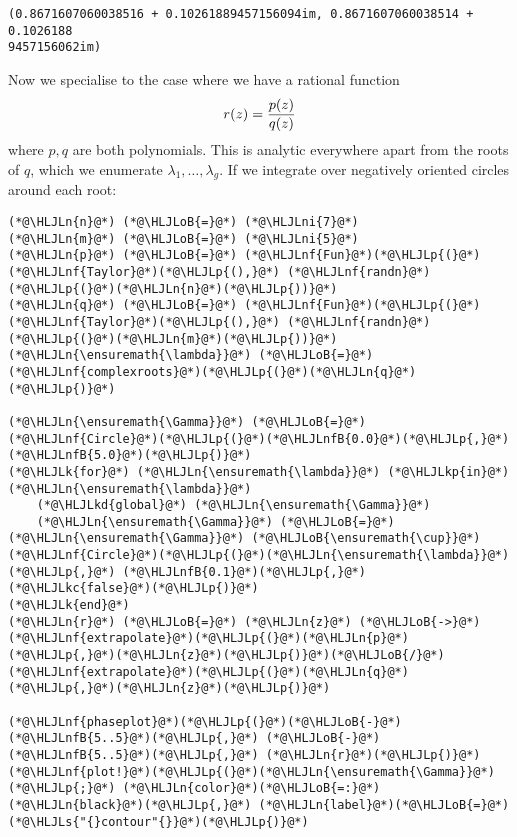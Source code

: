 \documentclass[12pt,landscape]{article}
\newcommand{\HLJLk}[1]{\textcolor[RGB]{148,91,176}{\textbf{#1}}}
\newcommand{\HLJLkc}[1]{\textcolor[RGB]{59,151,46}{\textit{#1}}}
\newcommand{\HLJLkd}[1]{\textcolor[RGB]{214,102,97}{\textit{#1}}}
\newcommand{\HLJLkp}[1]{\textcolor[RGB]{148,91,176}{\textbf{#1}}}
\newcommand{\HLJLn}[1]{#1}
\newcommand{\HLJLnf}[1]{\textcolor[RGB]{66,102,213}{#1}}
\newcommand{\HLJLs}[1]{\textcolor[RGB]{201,61,57}{#1}}
\newcommand{\HLJLnfB}[1]{\textcolor[RGB]{59,151,46}{#1}}
\newcommand{\HLJLni}[1]{\textcolor[RGB]{59,151,46}{#1}}
\newcommand{\HLJLoB}[1]{\textcolor[RGB]{102,102,102}{\textbf{#1}}}
\newcommand{\HLJLp}[1]{#1}
\begin{document}
{\begin{lstlisting}
(0.8671607060038516 + 0.10261889457156094im, 0.8671607060038514 + 0.1026188
9457156062im)
\end{lstlisting}


Now we specialise to the case where we have a rational function
\[
r(z) = {p(z) \over q(z)}
\]
where $p,q$ are both polynomials. This is analytic everywhere apart from the roots of $q$, which we enumerate $\lambda_1,\ldots,\lambda_g$.   If we integrate over negatively oriented circles around each root:


\begin{lstlisting}
(*@\HLJLn{n}@*) (*@\HLJLoB{=}@*) (*@\HLJLni{7}@*)
(*@\HLJLn{m}@*) (*@\HLJLoB{=}@*) (*@\HLJLni{5}@*)
(*@\HLJLn{p}@*) (*@\HLJLoB{=}@*) (*@\HLJLnf{Fun}@*)(*@\HLJLp{(}@*)(*@\HLJLnf{Taylor}@*)(*@\HLJLp{(),}@*) (*@\HLJLnf{randn}@*)(*@\HLJLp{(}@*)(*@\HLJLn{n}@*)(*@\HLJLp{))}@*)
(*@\HLJLn{q}@*) (*@\HLJLoB{=}@*) (*@\HLJLnf{Fun}@*)(*@\HLJLp{(}@*)(*@\HLJLnf{Taylor}@*)(*@\HLJLp{(),}@*) (*@\HLJLnf{randn}@*)(*@\HLJLp{(}@*)(*@\HLJLn{m}@*)(*@\HLJLp{))}@*)
(*@\HLJLn{\ensuremath{\lambda}}@*) (*@\HLJLoB{=}@*) (*@\HLJLnf{complexroots}@*)(*@\HLJLp{(}@*)(*@\HLJLn{q}@*)(*@\HLJLp{)}@*)

(*@\HLJLn{\ensuremath{\Gamma}}@*) (*@\HLJLoB{=}@*) (*@\HLJLnf{Circle}@*)(*@\HLJLp{(}@*)(*@\HLJLnfB{0.0}@*)(*@\HLJLp{,}@*) (*@\HLJLnfB{5.0}@*)(*@\HLJLp{)}@*)
(*@\HLJLk{for}@*) (*@\HLJLn{\ensuremath{\lambda}}@*) (*@\HLJLkp{in}@*) (*@\HLJLn{\ensuremath{\lambda}}@*)
    (*@\HLJLkd{global}@*) (*@\HLJLn{\ensuremath{\Gamma}}@*)
    (*@\HLJLn{\ensuremath{\Gamma}}@*) (*@\HLJLoB{=}@*) (*@\HLJLn{\ensuremath{\Gamma}}@*) (*@\HLJLoB{\ensuremath{\cup}}@*) (*@\HLJLnf{Circle}@*)(*@\HLJLp{(}@*)(*@\HLJLn{\ensuremath{\lambda}}@*)(*@\HLJLp{,}@*) (*@\HLJLnfB{0.1}@*)(*@\HLJLp{,}@*) (*@\HLJLkc{false}@*)(*@\HLJLp{)}@*)
(*@\HLJLk{end}@*)
(*@\HLJLn{r}@*) (*@\HLJLoB{=}@*) (*@\HLJLn{z}@*) (*@\HLJLoB{->}@*) (*@\HLJLnf{extrapolate}@*)(*@\HLJLp{(}@*)(*@\HLJLn{p}@*)(*@\HLJLp{,}@*)(*@\HLJLn{z}@*)(*@\HLJLp{)}@*)(*@\HLJLoB{/}@*)(*@\HLJLnf{extrapolate}@*)(*@\HLJLp{(}@*)(*@\HLJLn{q}@*)(*@\HLJLp{,}@*)(*@\HLJLn{z}@*)(*@\HLJLp{)}@*)

(*@\HLJLnf{phaseplot}@*)(*@\HLJLp{(}@*)(*@\HLJLoB{-}@*)(*@\HLJLnfB{5..5}@*)(*@\HLJLp{,}@*) (*@\HLJLoB{-}@*)(*@\HLJLnfB{5..5}@*)(*@\HLJLp{,}@*) (*@\HLJLn{r}@*)(*@\HLJLp{)}@*)
(*@\HLJLnf{plot!}@*)(*@\HLJLp{(}@*)(*@\HLJLn{\ensuremath{\Gamma}}@*)(*@\HLJLp{;}@*) (*@\HLJLn{color}@*)(*@\HLJLoB{=:}@*)(*@\HLJLn{black}@*)(*@\HLJLp{,}@*) (*@\HLJLn{label}@*)(*@\HLJLoB{=}@*)(*@\HLJLs{"{}contour"{}}@*)(*@\HLJLp{)}@*)
\end{lstlisting}

}
\end{document}
